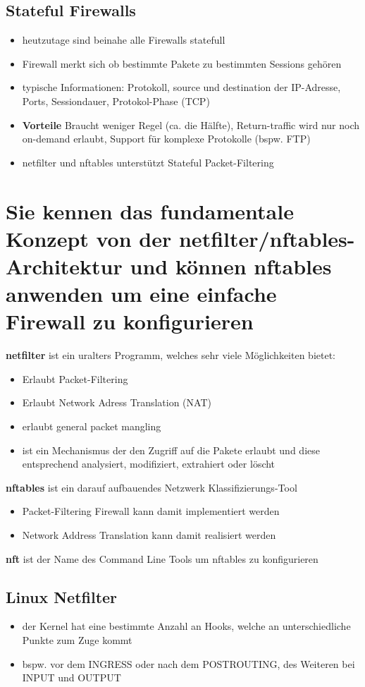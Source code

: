 \documentclass{report}
\theoremstyle{definition}
\theoremstyle{example}
\begin{document}
	\subsection{Stateful Firewalls}
\begin{itemize}
	\item heutzutage sind beinahe alle Firewalls statefull
	\item Firewall merkt sich ob bestimmte Pakete zu bestimmten Sessions gehören
	\item typische Informationen: Protokoll, source und destination der IP-Adresse, Ports, Sessiondauer, Protokol-Phase (TCP)
	\item \textbf{Vorteile} Braucht weniger Regel (ca. die Hälfte), Return-traffic wird nur noch on-demand erlaubt, Support für komplexe Protokolle (bspw. FTP)
	\item netfilter und nftables unterstützt Stateful Packet-Filtering
\end{itemize}


\section{Sie kennen das fundamentale Konzept von der netfilter/nftables-Architektur und können nftables anwenden um eine einfache Firewall zu konfigurieren}
\textbf{netfilter} ist ein uralters Programm, welches sehr viele Möglichkeiten bietet:
\begin{itemize}
	\item Erlaubt Packet-Filtering
	\item Erlaubt Network Adress Translation (NAT)
	\item erlaubt general packet mangling
	\item ist ein Mechanismus der den Zugriff auf die Pakete erlaubt und diese entsprechend analysiert, modifiziert, extrahiert oder löscht
\end{itemize}

\textbf{nftables} ist ein darauf aufbauendes Netzwerk Klassifizierungs-Tool
\begin{itemize}
	\item Packet-Filtering Firewall kann damit implementiert werden
	\item Network Address Translation kann damit realisiert werden
\end{itemize}

\textbf{nft} ist der Name des Command Line Tools um nftables zu konfigurieren

	\subsection{Linux Netfilter}
\begin{itemize}
	\item der Kernel hat eine bestimmte Anzahl an Hooks, welche an unterschiedliche Punkte zum Zuge kommt
	\item bspw. vor dem INGRESS oder nach dem POSTROUTING, des Weiteren bei INPUT und OUTPUT
\end{itemize}
\end{document}
